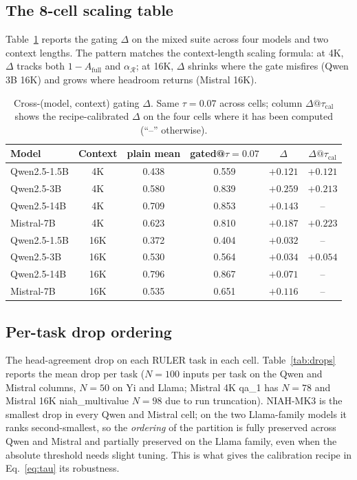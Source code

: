 \documentclass{article} %
\begin{document}
\subsection{The 8-cell scaling table}

Table~\ref{tab:scaling} reports the gating $\Delta$ on the mixed suite
across four models and two context lengths. The pattern matches the
context-length scaling formula: at 4K, $\Delta$ tracks both $1 -
A_{\mathrm{full}}$ and $\alpha_{\mathcal{R}}$; at 16K, $\Delta$ shrinks where
the gate misfires (Qwen 3B 16K) and grows where headroom returns
(Mistral 16K).

\begin{table}[h]
\centering
\caption{Cross-(model, context) gating $\Delta$. Same $\tau = 0.07$
across cells; column $\Delta@\tau_{\mathrm{cal}}$ shows the recipe-calibrated
$\Delta$ on the four cells where it has been computed (``--'' otherwise).}
\label{tab:scaling}
\begin{tabular}{lccccc}
\toprule
Model & Context & plain mean & gated@$\tau\!=\!0.07$ & $\Delta$ &
$\Delta@\tau_{\mathrm{cal}}$ \\
\midrule
Qwen2.5-1.5B   & 4K  & 0.438 & 0.559 & $+0.121$ & $+0.121$ \\
Qwen2.5-3B     & 4K  & 0.580 & 0.839 & $+0.259$ & $+0.213$ \\
Qwen2.5-14B    & 4K  & 0.709 & 0.853 & $+0.143$ & --       \\
Mistral-7B      & 4K  & 0.623 & 0.810 & $+0.187$ & $+0.223$ \\
\midrule
Qwen2.5-1.5B   & 16K & 0.372 & 0.404 & $+0.032$ & --       \\
Qwen2.5-3B     & 16K & 0.530 & 0.564 & $+0.034$ & $+0.054$ \\
Qwen2.5-14B    & 16K & 0.796 & 0.867 & $+0.071$ & --       \\
Mistral-7B      & 16K & 0.535 & 0.651 & $+0.116$ & --       \\
\bottomrule
\end{tabular}
\end{table}

\subsection{Per-task drop ordering}
\label{subsec:drops-ordering}

The head-agreement drop on each RULER task in each cell.
Table~\ref{tab:drops} reports the mean drop per task ($N = 100$ inputs
per task on the Qwen and Mistral columns, $N = 50$ on Yi and Llama;
Mistral 4K qa\_1 has $N = 78$ and Mistral 16K niah\_multivalue $N = 98$
due to run truncation). NIAH-MK3 is the smallest drop in every Qwen and
Mistral cell; on the two Llama-family models it ranks second-smallest,
so the \emph{ordering} of the partition is fully preserved across Qwen
and Mistral and partially preserved on the Llama family, even when the
absolute threshold needs slight tuning. This is
what gives the calibration recipe in Eq.~\eqref{eq:tau} its robustness.
\end{document}
